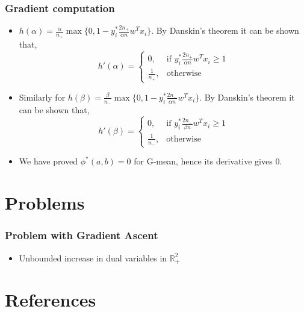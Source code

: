 \documentclass{beamer}
\begin{document}
\begin{frame}
	\frametitle{Gradient computation}
	\begin{itemize}
	\item $h(\alpha) = \frac{\alpha}{n_+}\max\{0,1-y_i^*\frac{2n_+}{\alpha n}w^Tx_i\}$. 
	By Danskin's theorem it can be shown that,
	\[
		h'(\alpha)=
		\begin{cases}
		0,&\text{if }y_i^*\frac{2n_+}{\alpha n}w^Tx_i \geq 1\\
		\frac{1}{n_+},&\text{otherwise}
		\end{cases}
	\]
	\item Similarly for $h(\beta) = \frac{\beta}{n_-}\max\{0,1-y_i^*\frac{2n_-}{\alpha n}w^Tx_i\}$. 
	By Danskin's theorem it can be shown that,
	\[
		h'(\beta)=
		\begin{cases}
		0,&\text{if }y_i^*\frac{2n_-}{\beta n}w^Tx_i \geq 1\\
		\frac{1}{n_-},&\text{otherwise}
		\end{cases}
	\]
	\item We have proved $\phi^*(a,b)=0$ for G-mean, hence its derivative gives 0.
	\end{itemize}
\end{frame}
\section{Problems}
\begin{frame}
	\frametitle{Problem with Gradient Ascent}
	\begin{itemize}
	\item Unbounded increase in dual variables in $\mathbb{R}^2_+$
	\end{itemize}
\end{frame}
\section{References} %
\end{document}
